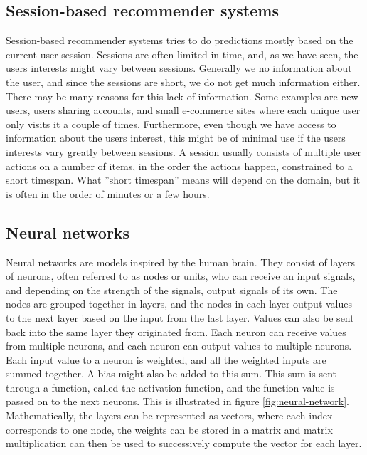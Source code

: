 \subsection{Session-based recommender systems}
Session-based recommender systems tries to do predictions mostly based on the current user session. Sessions are often limited in time, and, as we have seen, the users interests might vary between sessions. Generally we no information about the user, and since the sessions are short, we do not get much information either. There may be many reasons for this lack of information. Some examples are new users, users sharing accounts, and small e-commerce sites where each unique user only visits it a couple of times. Furthermore, even though we have access to information about the users interest, this might be of minimal use if the users interests vary greatly between sessions. A session usually consists of multiple user actions on a number of items, in the order the actions happen, constrained to a short timespan. What ''short timespan'' means will depend on the domain, but it is often in the order of minutes or a few hours.\\

\subsection{Neural networks}
Neural networks are models inspired by the human brain. They consist of layers of neurons, often referred to as nodes or units, who can receive an input signals, and depending on the strength of the signals, output signals of its own. The nodes are grouped together in layers, and the nodes in each layer output values to the next layer based on the input from the last layer. Values can also be sent back into the same layer they originated from. Each neuron can receive values from multiple neurons, and each neuron can output values to multiple neurons. Each input value to a neuron is weighted, and all the weighted inputs are summed together. A bias might also be added to this sum. This sum is sent through a function, called the activation function, and the function value is passed on to the next neurons. This is illustrated in figure \ref{fig:neural-network}. Mathematically, the layers can be represented as vectors, where each index corresponds to one node, the weights can be stored in a matrix and matrix multiplication can then be used to successively compute the vector for each layer.\\

